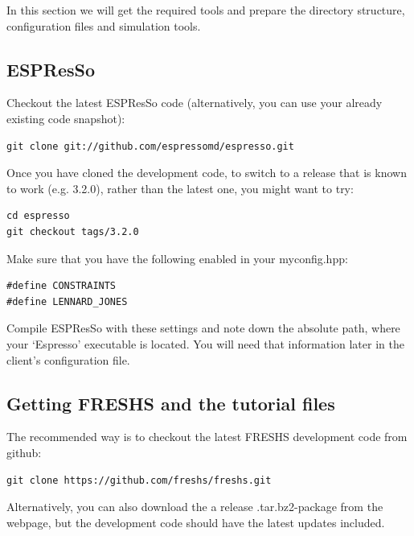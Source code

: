 \documentclass[a4paper,oneside]{article}
\newenvironment{mylisting}
{\begin{list}{}{\setlength{\leftmargin}{1em}}\item\scriptsize\bfseries}
{\end{list}}
\begin{document}
In this section we will get the required tools and prepare the directory structure, configuration files and simulation tools.

\subsection{ESPResSo}
Checkout the latest ESPResSo code (alternatively, you can use your already existing code snapshot):
\begin{mylisting}
\begin{verbatim}
git clone git://github.com/espressomd/espresso.git
\end{verbatim}
\end{mylisting}

Once you have cloned the development code, to switch to a release that is known to work (e.g. 3.2.0), rather than the latest one, you might want to try:

\begin{mylisting}
\begin{verbatim}
cd espresso
git checkout tags/3.2.0
\end{verbatim}
\end{mylisting}



Make sure that you have the following enabled in your myconfig.hpp:
\begin{lstlisting}
#define CONSTRAINTS
#define LENNARD_JONES
\end{lstlisting}
Compile ESPResSo with these settings and note down the absolute path, where your `Espresso' executable is located. You will need that information later in the client's configuration file.


\subsection{Getting FRESHS and the tutorial files}

The recommended way is to checkout the latest FRESHS development code from github:
\begin{mylisting}
\begin{verbatim}
git clone https://github.com/freshs/freshs.git
\end{verbatim}
\end{mylisting}


Alternatively, you can also download the a release .tar.bz2-package from the webpage, but the development code should have the latest updates included.
\end{document}

